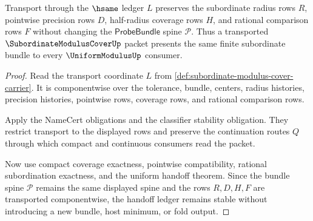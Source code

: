 \begin{theorem}
\label{thm:subordinate-modulus-cover-radius-stability}
Transport through the $\hsame$ ledger $L$ preserves the subordinate radius rows $R$, pointwise precision rows $D$, half-radius coverage rows $H$, and rational comparison rows $F$ without changing the $\mathsf{ProbeBundle}$ spine $\mathcal{P}$. Thus a transported $\SubordinateModulusCoverUp$ packet presents the same finite subordinate bundle to every $\UniformModulusUp$ consumer.
\end{theorem}
\begin{proof}
Read the transport coordinate $L$ from \autoref{def:subordinate-modulus-cover-carrier}. It is componentwise over the tolerance, bundle, centers, radius histories, precision histories, pointwise rows, coverage rows, and rational comparison rows.

Apply the NameCert obligations and the classifier stability obligation. They restrict transport to the displayed rows and preserve the continuation routes $Q$ through which compact and continuous consumers read the packet.

Now use compact coverage exactness, pointwise compatibility, rational subordination exactness, and the uniform handoff theorem. Since the bundle spine $\mathcal{P}$ remains the same displayed spine and the rows $R,D,H,F$ are transported componentwise, the handoff ledger remains stable without introducing a new bundle, host minimum, or fold output.
\end{proof}

